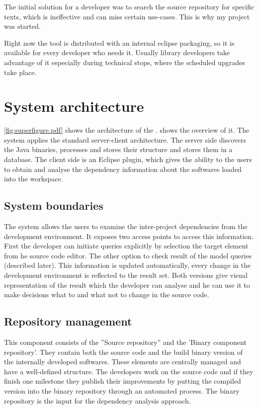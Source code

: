 The initial solution for a developer was to search the source repository for specific
texts, which is ineffective and can miss certain use-cases. This is why my project
was started.

Right now the tool is distributed with an internal eclipse packaging, so it is available 
for every developer who needs it. Usually library developers take advantage of it 
especially during technical stops, where the scheduled upgrades take place. 


 




\section{System architecture}

\autoref{fig:superfigure.pdf}  shows the architecture of the \ptool{}.
shows the overview of it. The system applies the standard server-client
architecture. The server side discovers the Java binaries, processes and stores
their structure and stores them in a database. The client side is an Eclipse
plugin, which gives the ability to the users to obtain and analyse the
dependency information about the softwares loaded into the workspace. 


\subsection{System boundaries}
The system allows the users to examine the inter-project dependencies from the
development environment. It exposes two access points to access this
information. First the developer can initiate queries explicitly by selection
the target element from  he source code editor. The other option to check result
of the model queries (described later). This information is updated
automatically, every change in the development environment is reflected to the
result set. Both versions give visual representation of the result which the
developer can analyse and he can use it to make decisions what to and what not
to change in the source code.


\subsection{Repository management}
This component consists of the ''Source repository'' and the 'Binary component
repository'. They contain both the source code and the build binary version of
the internally developed softwares. These elements are centrally managed and
have a well-defined structure. The developers work on the source code and if
they finish one milestone they publish their improvements by putting the
compiled version into the binary repository through an automated process.
The binary repository is the input for the dependency analysis approach.

